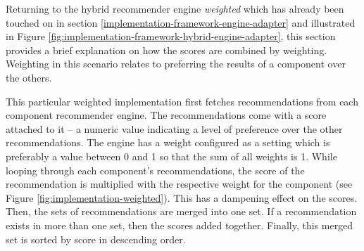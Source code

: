 Returning to the hybrid recommender engine \emph{weighted} which has already been touched on in section \ref{implementation-framework-engine-adapter} and illustrated in Figure \ref{fig:implementation-framework-hybrid-engine-adapter}, this section provides a brief explanation on how the scores are combined by weighting. Weighting in this scenario relates to preferring the results of a  component over the others.

This particular weighted implementation first fetches recommendations from each component recommender engine. The recommendations come with a score attached to it -- a numeric value indicating a level of preference over the other recommendations. The engine has a weight configured as a setting which is preferably a value between 0 and 1 so that the sum of all weights is 1. While looping through each component's recommendations, the score of the recommendation is multiplied with the respective weight for the component (see Figure \ref{fig:implementation-weighted}). This has a dampening effect on the scores. Then, the sets of recommendations are merged into one set. If a recommendation exists in more than one set, then the scores added together. Finally, this merged set is sorted by score in descending order.

